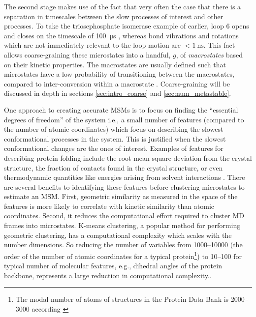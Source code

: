 The second stage makes use of the fact that very often the case that there is a separation in timescales between the slow processes of interest and other processes. To take the triosephosphate isomerase example of earlier, loop 6 opens and closes on the timescale of \SI{100}{\micro\second} \cite{LoopMotionTriosephosphate}, whereas bond vibrations and rotations which are not immediately relevant to the loop motion are $<\SI{1}{\nano\second}$. This fact allows coarse-graining these microstates into a handful, $g$, of \emph{macrostates} based on their kinetic properties. The macrostates are usually defined such that microstates have a low probability of transitioning between the macrostates, compared to inter-conversion within a macrostate \cite{schutteDirectApproachConformational1999,swopeDescribingProteinFolding2004, prinzMarkovModelsMolecular2011}. Coarse-graining will be discussed in depth in sections \ref{sec:intro_coarse} and \ref{sec:num_metastable}. 


One approach to creating accurate MSMs is to focus on finding the ``essential degrees of freedom'' of the system \cite{zwanzigClassicalDynamicsContinuous1983a, schutteDirectApproachConformational1999} i.e., a small number of features  (compared to the number of atomic coordinates)  which focus on describing the slowest conformational processes in the system. This is justified when the slowest conformational changes are the ones of interest. Examples of features for describing protein folding include the root mean square deviation from the crystal structure, the fraction of contacts found in the crystal structure, or even thermodynamic quantities like energies arising from solvent interactions \cite{chongExaminingThermodynamicOrder2018}. There are several benefits to identifying these features before clustering microstates to estimate an MSM. First, geometric similarity as measured in the space of the features is more likely to correlate with kinetic similarity than atomic coordinates.  Second, it reduces the computational effort required to cluster MD frames into microstates. K-means clustering, a popular method for performing geometric clustering, has a computational complexity which scales with the number dimensions. So reducing the number of variables from \numrange{1000}{10000} (the order of the number of atomic coordinates for a typical protein\footnote{The modal number of atoms of structures in the Protein Data Bank is \numrange{2000}{3000} according \cite{bankPDBStatisticsPDB}}) to \numrange{10}{100} for typical number of molecular features, e.g., dihedral angles of the protein backbone, represents a large reduction in computational complexity.. 


